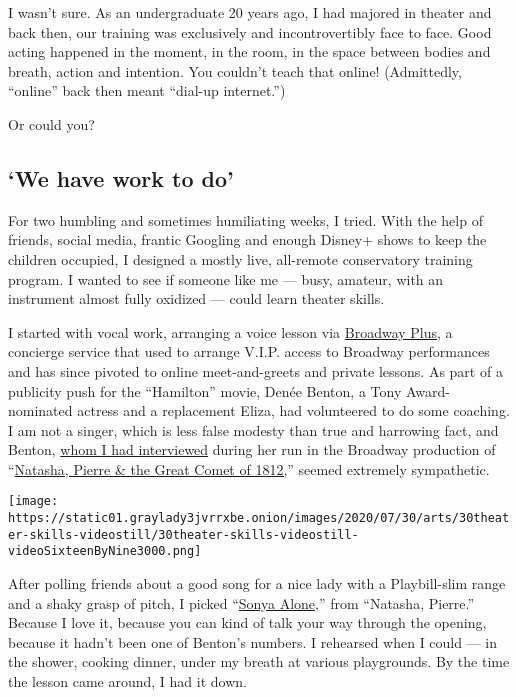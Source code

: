 I wasn't sure. As an undergraduate 20 years ago, I had majored in
theater and back then, our training was exclusively and incontrovertibly
face to face. Good acting happened in the moment, in the room, in the
space between bodies and breath, action and intention. You couldn't
teach that online! (Admittedly, ``online'' back then meant ``dial-up
internet.'')

Or could you?

\hypertarget{we-have-work-to-do}{%
\subsection{`We have work to do'}\label{we-have-work-to-do}}

For two humbling and sometimes humiliating weeks, I tried. With the help
of friends, social media, frantic Googling and enough Disney+ shows to
keep the children occupied, I designed a mostly live, all-remote
conservatory training program. I wanted to see if someone like me ---
busy, amateur, with an instrument almost fully oxidized --- could learn
theater skills.

I started with vocal work, arranging a voice lesson via
\href{https://broadwayplus.com/}{Broadway Plus}, a concierge service
that used to arrange V.I.P. access to Broadway performances and has
since pivoted to online meet-and-greets and private lessons. As part of
a publicity push for the ``Hamilton'' movie, Denée Benton, a Tony
Award-nominated actress and a replacement Eliza, had volunteered to do
some coaching. I am not a singer, which is less false modesty than true
and harrowing fact, and Benton,
\href{https://www.nytimes3xbfgragh.onion/2017/05/11/theater/denee-benton-tony-nominee-embraces-her-inner-natasha.html}{whom
I had interviewed} during her run in the Broadway production of
``\href{https://www.nytimes3xbfgragh.onion/2016/11/15/theater/natasha-pierre-and-the-great-comet-of-1812-review.html}{Natasha,
Pierre \& the Great Comet of 1812,}'' seemed extremely sympathetic.

\texttt{[image: https://static01.graylady3jvrrxbe.onion/images/2020/07/30/arts/30theater-skills-videostill/30theater-skills-videostill-videoSixteenByNine3000.png]}

After polling friends about a good song for a nice lady with a
Playbill-slim range and a shaky grasp of pitch, I picked
``\href{https://www.youtube.com/watch?v=_HHmHv26tao}{Sonya Alone},''
from ``Natasha, Pierre.'' Because I love it, because you can kind of
talk your way through the opening, because it hadn't been one of
Benton's numbers. I rehearsed when I could --- in the shower, cooking
dinner, under my breath at various playgrounds. By the time the lesson
came around, I had it down.

